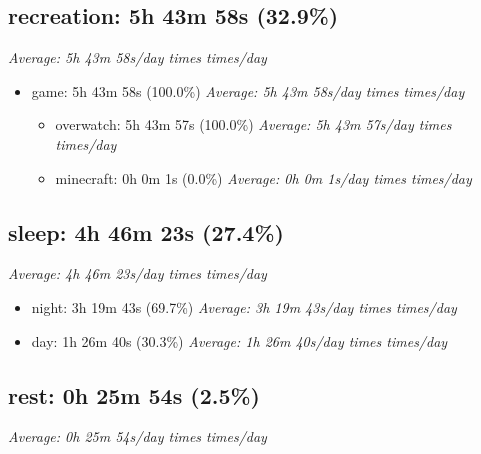 \documentclass[12pt]{extarticle}
\begin{document}
{\fontsize{16}{19.2}\selectfont\subsection*{recreation: 5h 43m 58s (32.9\%)}}
\textit{Average: 5h 43m 58s/day  times  times/day}\par
\begin{itemize}[topsep=0pt, itemsep=-0.5ex]
    \item game: 5h 43m 58s (100.0\%)
        \textit{Average: 5h 43m 58s/day  times  times/day}\par
\begin{itemize}[topsep=0pt, itemsep=-0.5ex]
    \item overwatch: 5h 43m 57s (100.0\%)
        \textit{Average: 5h 43m 57s/day  times  times/day}\par
    \item minecraft: 0h 0m 1s (0.0\%)
        \textit{Average: 0h 0m 1s/day  times  times/day}\par
\end{itemize}
\end{itemize}
{\fontsize{16}{19.2}\selectfont\subsection*{sleep: 4h 46m 23s (27.4\%)}}
\textit{Average: 4h 46m 23s/day  times  times/day}\par
\begin{itemize}[topsep=0pt, itemsep=-0.5ex]
    \item night: 3h 19m 43s (69.7\%)
        \textit{Average: 3h 19m 43s/day  times  times/day}\par
    \item day: 1h 26m 40s (30.3\%)
        \textit{Average: 1h 26m 40s/day  times  times/day}\par
\end{itemize}
{\fontsize{16}{19.2}\selectfont\subsection*{rest: 0h 25m 54s (2.5\%)}}
\textit{Average: 0h 25m 54s/day  times  times/day}\par
\end{document}
